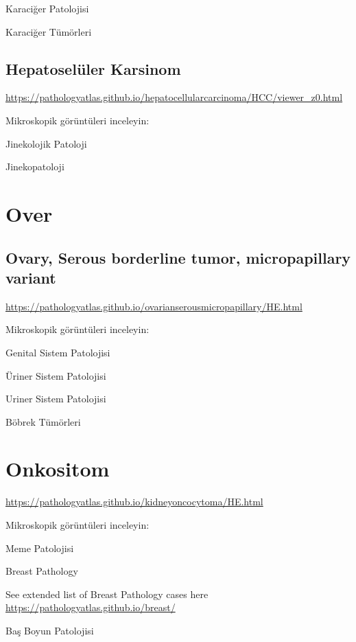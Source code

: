 \documentclass[
  letterpaper,
  DIV=11,
  numbers=noendperiod]{scrreprt}
\begin{document}
Karaciğer Patolojisi

Karaciğer Tümörleri

\hypertarget{hepatoseluxfcler-karsinom}{%
\section{Hepatoselüler Karsinom}\label{hepatoseluxfcler-karsinom}}

\url{https://pathologyatlas.github.io/hepatocellularcarcinoma/HCC/viewer_z0.html}

Mikroskopik görüntüleri inceleyin:

Jinekolojik Patoloji

Jinekopatoloji

\hypertarget{over}{%
\chapter{Over}\label{over}}

\hypertarget{ovary-serous-borderline-tumor-micropapillary-variant}{%
\section{Ovary, Serous borderline tumor, micropapillary
variant}\label{ovary-serous-borderline-tumor-micropapillary-variant}}

\url{https://pathologyatlas.github.io/ovarianserousmicropapillary/HE.html}

Mikroskopik görüntüleri inceleyin:

Genital Sistem Patolojisi

Üriner Sistem Patolojisi

Uriner Sistem Patolojisi

Böbrek Tümörleri

\hypertarget{onkositom}{%
\chapter{Onkositom}\label{onkositom}}

\url{https://pathologyatlas.github.io/kidneyoncocytoma/HE.html}

Mikroskopik görüntüleri inceleyin:

Meme Patolojisi

Breast Pathology

See extended list of Breast Pathology cases here
\url{https://pathologyatlas.github.io/breast/}

Baş Boyun Patolojisi
\end{document}
